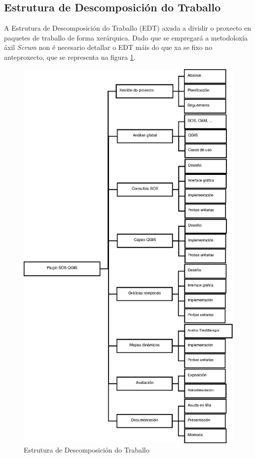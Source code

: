 \subsection{Estrutura de Descomposición do Traballo}
A Estrutura de Descomposición do Traballo (EDT) axuda a dividir o proxecto en paquetes de traballo de forma xerárquica. Dado que se empregará a metodoloxía áxil \emph{Scrum} non é necesario detallar o EDT máis do que xa se fixo no anteproxecto, que se representa na figura \ref{fig:edt}.

\begin{figure}[hbtp]
\centering
\includegraphics[scale=1]{images/edt.eps}
\caption{Estrutura de Descomposición do Traballo}
\label{fig:edt} 
\end{figure}

